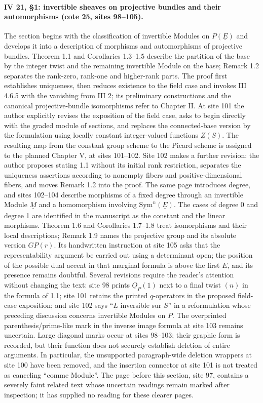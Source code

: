 \documentclass[10pt,a4paper]{article}
\begin{document}
\paragraph{IV 21, \S 1: invertible sheaves on projective bundles and their automorphisms (cote 25, sites 98--105).}
The section begins with the classification of invertible Modules on $P(\underline E)$ and develops it into a description of morphisms and automorphisms of projective bundles. Theorem 1.1 and Corollaries 1.3--1.5 describe the partition of the base by the integer twist and the remaining invertible Module on the base; Remark 1.2 separates the rank-zero, rank-one and higher-rank parts. The proof first establishes uniqueness, then reduces existence to the field case and invokes III 4.6.5 with the vanishing from III 2; its preliminary constructions and the canonical projective-bundle isomorphisms refer to Chapter II. At site 101 the author explicitly revises the exposition of the field case, asks to begin directly with the graded module of sections, and replaces the connected-base version by the formulation using locally constant integer-valued functions $\underline Z(S)$. The resulting map from the constant group scheme to the Picard scheme is assigned to the planned Chapter V, at sites 101--102. Site 102 makes a further revision: the author proposes stating 1.1 without its initial rank restriction, separates the uniqueness assertions according to nonempty fibers and positive-dimensional fibers, and moves Remark 1.2 into the proof. The same page introduces degree, and sites 102--104 describe morphisms of a fixed degree through an invertible Module $\underline M$ and a homomorphism involving $\underline{\mathrm{Sym}}^n(\underline E)$. The cases of degree 0 and degree 1 are identified in the manuscript as the constant and the linear morphisms. Theorem 1.6 and Corollaries 1.7--1.8 treat isomorphisms and their local descriptions; Remark 1.9 names the projective group and its absolute version $GP(r)$. Its handwritten instruction at site 105 asks that the representability argument be carried out using a determinant open; the position of the possible dual accent in that marginal formula is above the first $E$, and its presence remains doubtful. Several revisions require the reader's attention without changing the text: site 98 prints $\underline O_P(1)$ next to a final twist $(n)$ in the formula of 1.1; site 101 retains the printed $q$-operators in the proposed field-case exposition; and site 102 says ``$\underline L$ inversible sur $S$'' in a reformulation whose preceding discussion concerns invertible Modules on $P$. The overprinted parenthesis/prime-like mark in the inverse image formula at site 103 remains uncertain. Large diagonal marks occur at sites 98--103; their graphic form is recorded, but their function does not securely establish deletion of entire arguments. In particular, the unsupported paragraph-wide deletion wrappers at site 100 have been removed, and the insertion connector at site 101 is not treated as canceling ``comme Module''. The page before this section, site 97, contains a severely faint related text whose uncertain readings remain marked after inspection; it has supplied no reading for these clearer pages.
\par{}
\end{document}
